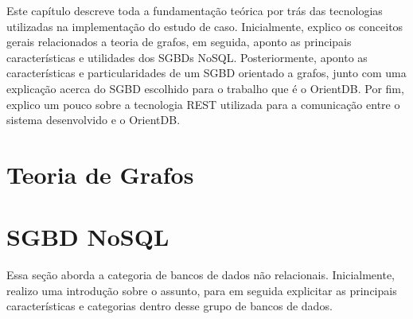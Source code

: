 \newcommand{\texCommand}[1]{\texttt{\textbackslash{#1}}}%

\newcommand{\exemplo}[1]{%
\vspace{\baselineskip}%
\noindent\fbox{\begin{minipage}{\textwidth}#1\end{minipage}}%
\\\vspace{\baselineskip}}%

\newcommand{\exemploVerbatim}[1]{%
\vspace{\baselineskip}%
\noindent\fbox{\begin{minipage}{\textwidth}%
#1\end{minipage}}%
\\\vspace{\baselineskip}}%

Este capítulo descreve toda a fundamentação teórica por trás das tecnologias utilizadas na implementação do estudo de caso. Inicialmente, explico os conceitos gerais relacionados a teoria de grafos, em seguida, aponto as principais características e utilidades dos SGBDs NoSQL. Posteriormente, aponto as características e particularidades de um SGBD orientado a grafos, junto com uma explicação acerca do SGBD escolhido para o trabalho que é o OrientDB. Por fim, explico um pouco sobre a tecnologia REST utilizada para a comunicação entre o sistema desenvolvido e o OrientDB.

\section{Teoria de Grafos} \label{graph_theory}



\section{SGBD NoSQL}
	Essa seção aborda a categoria de bancos de dados não relacionais. Inicialmente, realizo uma introdução sobre o assunto, para em seguida explicitar as principais características e categorias dentro desse grupo de bancos de dados.
	
